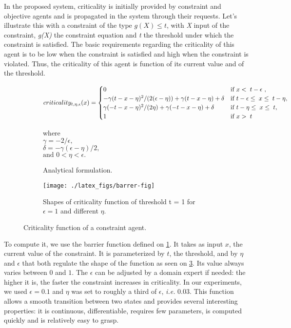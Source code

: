 In the proposed system, criticality is initially provided by constraint and objective agents and is propagated in the system through their requests.
Let's illustrate this with a constraint of the type \(g(X) \leq t\), with \emph{X} input of the constraint, \emph{g(X)} the constraint equation and \emph{t} the threshold under which the constraint is satisfied. The basic requirements regarding the criticality of this agent is to be low when the constraint is satisfied and high when the constraint is violated. Thus, the criticality of this agent is function of its current value and of the threshold.


\begin{figure}
	\centering
	\begin{subfigure}[b]{\textwidth}
	  \centering
	  \scriptsize
	  
		\[criticality_{t,\eta,\epsilon}(x)=
			\begin{cases}
				0		&\text{if \( x < \; t - \epsilon \) },\\
				-\gamma ( t - x - \eta ) ^ 2 / ( 2 ( \epsilon - \eta)) + \gamma ( t - x - \eta ) + \delta &\text{if \(t - \epsilon \leq \;x \leq \;t - \eta \)},\\
				\gamma (-t-x-\eta)^2/(2 \eta)+\gamma (-t-x-\eta) + \delta &\text{if \(t - \eta \leq \;x \leq \;t\)},\\
				1	&\text{if \( x > \; t \)}
			\end{cases}\]

		where\\
		$\gamma = -2/ \epsilon,$\\
		$\delta = -\gamma (\epsilon - \eta )/2,$\\
		$\text{and } 0 < \eta < \epsilon.$
	  \caption{Analytical formulation.}\label{crit_func}
	\end{subfigure}
	
	\begin{subfigure}[b]{\textwidth}
		\centering
		\texttt{[image: ./latex\_figs/barrer-fig]}
		\caption{Shapes of criticality function of threshold t = 1 for \(\epsilon=1\) and different \(\eta\).}\label{crit_shapes}
	\end{subfigure}
	
\caption{Criticality function of a constraint agent.}
\end{figure}

To compute it, we use the barrier function defined on \figurename{} \ref{crit_func}. It takes as input \(x\), the current value of the constraint. It is parameterized by \(t\), the threshold, and by \(\eta\) and \(\epsilon\) that both regulate the shape of the function as seen on \figurename{} \ref{crit_shapes}. Its value always varies between \(0\) and \(1\).
The \(\epsilon\) can be adjusted by a domain expert if needed: the higher it is, the faster the constraint increases in criticality.
In our experiments, we used $\epsilon = 0.1$ and  $\eta$ was set to roughly a third of $\epsilon$, \textit{i.e.} 0.03.
This function allows a smooth transition between two states and provides several interesting properties: it is continuous, differentiable, requires few parameters, is computed quickly and is relatively easy to grasp.

